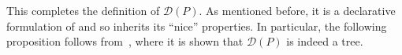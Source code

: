 This completes the definition of $\mathcal{D}(P)$. As mentioned before, it is a declarative formulation of \trust and so inherits its ``nice'' properties. In particular, the following proposition follows from~\cite{trust}, where it is shown that $\mathcal{D}(P)$ is indeed a tree.







